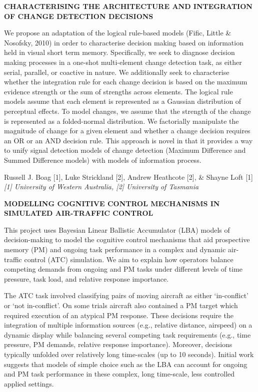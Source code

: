 \documentclass[]{article}
\begin{document}
\textbf{CHARACTERISING THE ARCHITECTURE AND INTEGRATION OF CHANGE
DETECTION DECISIONS}

We propose an adaptation of the logical rule-based models (Fific, Little
\& Nosofsky, 2010) in order to characterise decision making based on
information held in visual short term memory. Specifically, we seek to
diagnose decision making processes in a one-shot multi-element change
detection task, as either serial, parallel, or coactive in nature. We
additionally seek to characterise whether the integration rule for each
change decision is based on the maximum evidence strength or the sum of
strengths across elements. The logical rule models assume that each
element is represented as a Gaussian distribution of perceptual effects.
To model changes, we assume that the strength of the change is
represented as a folded-normal distribution. We factorially manipulate
the magnitude of change for a given element and whether a change
decision requires an OR or an AND decision rule. This approach is novel
in that it provides a way to unify signal detection models of change
detection (Maximum Difference and Summed Difference models) with models
of information process.\\
\pagebreak  

Russell J. Boag {[}1{]}, Luke Strickland {[}2{]}, Andrew Heathcote
{[}2{]}, \& Shayne Loft {[}1{]}\\
\emph{{[}1{]} University of Western Australia, {[}2{]} University of
Tasmania}

\textbf{MODELLING COGNITIVE CONTROL MECHANISMS IN SIMULATED AIR-TRAFFIC
CONTROL}

This project uses Bayesian Linear Ballistic Accumulator (LBA) models of
decision-making to model the cognitive control mechanisms that aid
prospective memory (PM) and ongoing task performance in a complex and
dynamic air-traffic control (ATC) simulation. We aim to explain how
operators balance competing demands from ongoing and PM tasks under
different levels of time pressure, task load, and relative response
importance.

The ATC task involved classifying pairs of moving aircraft as either
`in-conflict' or `not in-conflict'. On some trials aircraft also
contained a PM target which required execution of an atypical PM
response. These decisions require the integration of multiple
information sources (e.g., relative distance, airspeed) on a dynamic
display while balancing several competing task requirements (e.g., time
pressure, PM demands, relative response importance). Moreover, decisions
typically unfolded over relatively long time-scales (up to 10 seconds).
Initial work suggests that models of simple choice such as the LBA can
account for ongoing and PM task performance in these complex, long
time-scale, less controlled applied settings.
\end{document}
